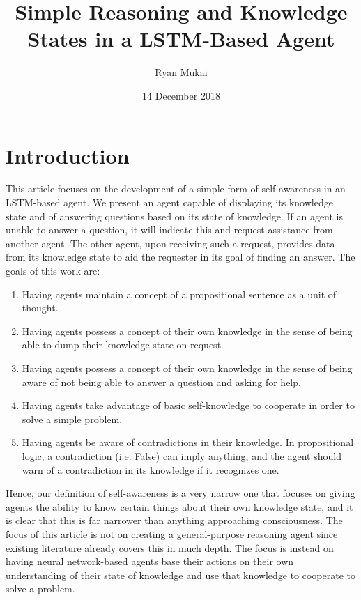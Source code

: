 \documentclass{article}
\title{Simple Reasoning and Knowledge States in a LSTM-Based Agent}
\author{Ryan Mukai}
\date{14 December 2018}
\begin{document}
\maketitle

\section{Introduction}

This article focuses on the development of a simple form of self-awareness in an LSTM-based agent. We present an agent capable of displaying its knowledge state and of answering questions based on its state of knowledge. If an agent is unable to answer a question, it will indicate this and request assistance from another agent. The other agent, upon receiving such a request, provides data from its knowledge state to aid the requester in its goal of finding an answer. The goals of this work are:

\begin{enumerate}
	\item Having agents maintain a concept of a propositional sentence as a unit of thought.
	\item Having agents possess a concept of their own knowledge in the sense of being able to dump their knowledge state on request.
	\item Having agents possess a concept of their own knowledge in the sense of being aware of not being able to answer a question and asking for help.
	\item Having agents take advantage of basic self-knowledge to cooperate in order to solve a simple problem.
	\item Having agents be aware of contradictions in their knowledge. In propositional logic, a contradiction (i.e. False) can imply anything, and the agent should warn of a contradiction in its knowledge if it recognizes one.
\end{enumerate}

Hence, our definition of self-awareness is a very narrow one that focuses on giving agents the ability to know certain things about their own knowledge state, and it is clear that this is far narrower than anything approaching consciousness. The focus of this article is not on creating a general-purpose reasoning agent since existing literature already covers this in much depth. The focus is instead on having neural network-based agents base their actions on their own understanding of their state of knowledge and use that knowledge to cooperate to solve a problem.
\end{document}
